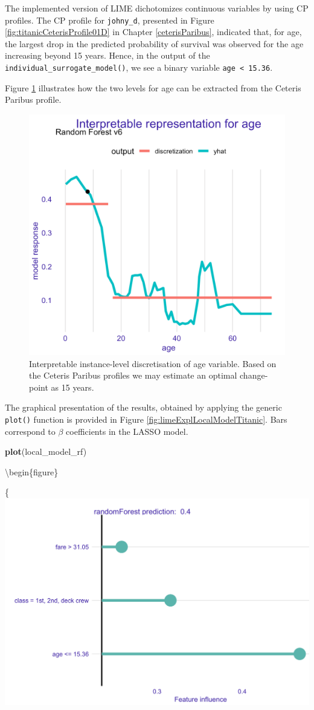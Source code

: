 \documentclass[12pt,]{krantz}
\newenvironment{Shaded}{\begin{snugshade}}{\end{snugshade}}
\newcommand{\KeywordTok}[1]{\textcolor[rgb]{0.13,0.29,0.53}{\textbf{#1}}}
\newcommand{\NormalTok}[1]{#1}
\begin{document}
The implemented version of LIME dichotomizes continuous variables by using CP profiles. The CP profile for \texttt{johny\_d}, presented in Figure \ref{fig:titanicCeterisProfile01D} in Chapter \ref{ceterisParibus}, indicated that, for age, the largest drop in the predicted probability of survival was observed for the age increasing beyond 15 years. Hence, in the output of the \texttt{individual\_surrogate\_model()}, we see a binary variable \texttt{age\ \textless{}\ 15.36}.

Figure \ref{fig:LIMEexample02} illustrates how the two levels for age can be extracted from the Ceteris Paribus profile.

\begin{figure}

{\centering \includegraphics[width=0.6\linewidth]{figure/LIMEexample02} 

}

\caption{Interpretable instance-level discretisation of age variable. Based on the Ceteris Paribus profiles we may estimate an optimal change-point as 15 years.}\label{fig:LIMEexample02}
\end{figure}

The graphical presentation of the results, obtained by applying the generic \texttt{plot()} function is provided in Figure \ref{fig:limeExplLocalModelTitanic}.
Bars correspond to \(\beta\) coefficients in the LASSO model.

\begin{Shaded}
\begin{Highlighting}[]
\KeywordTok{plot}\NormalTok{(local_model_rf)}
\end{Highlighting}
\end{Shaded}

\textbackslash{}begin\{figure\}

\{\centering \includegraphics[width=0.6\linewidth]{figure/lime_expl_localModel_titanic}
\end{document}
